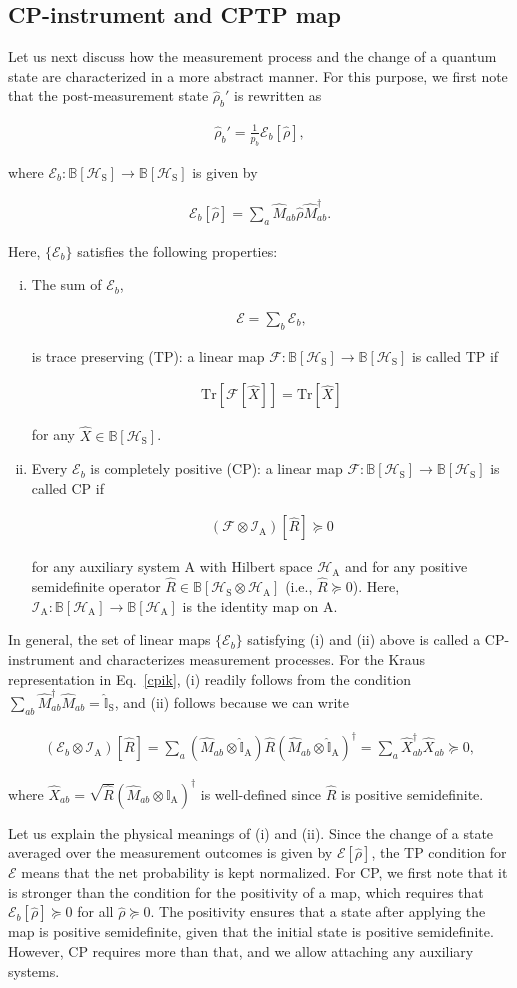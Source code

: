 \documentclass[preprint,pteplogo]{ptephy_v2}%
\numberwithin{equation}{section}
\theoremstyle{definition}
\newcommand{\mc}[1]{\mathcal{#1}}
\newcommand{\ml}[1]{\mathcal{#1}}
\newcommand{\mr}[1]{\mathrm{#1}}
\newcommand{\mbb}[1]{\mathbb{#1}}
\newcommand{\aln}[1]{
\begin{align}
#1
\end{align}
}
\newcommand{\ra}{\rightarrow}
\newcommand{\Tr}{\mr{Tr}}
\begin{document}
\subsection{CP-instrument and CPTP map}
Let us next discuss how the measurement process and the change of a quantum state are characterized in a more abstract manner.
For this purpose, we first note that the post-measurement state $\hat{\rho}_b'$ is rewritten as
\aln{\label{change}
\hat{\rho}_b'=\frac{1}{p_b}\ml{E}_b[\hat{\rho}],
}
where $\ml{E}_b:\mbb{B}[\ml{H}_\mr{S}]\ra\mbb{B}[\ml{H}_\mr{S}]$ is given by
\aln{\label{cpik}
\ml{E}_b[\hat{\rho}]=\sum_a\hat{M}_{ab}\hat{\rho}\hat{M}_{ab}^\dag.
}
Here, $\{\ml{E}_b\}$ satisfies the following properties:
\begin{enumerate}[(i)]
\def\labelenumi{(\theenumi)}
\item 
The sum of $\mc{E}_b$,
\aln{
\ml{E}=\sum_b\ml{E}_b,
}
is trace preserving (TP): a linear map $\mc{F}: \mbb{B}[\mc{H}_\mr{S}] \to \mbb{B}[\mc{H}_\mr{S}]$ is called TP if
\aln{
\Tr[\ml{F}[\hat{X}]]=\Tr[\hat{X}]
}
for any $\hat{X} \in \mbb{B}[\mc{H}_\mr{S}]$.

\item 
Every $\mc{E}_b$ is completely positive (CP): a linear map $\mc{F}: \mbb{B}[\mc{H}_\mr{S}] \to \mbb{B}[\mc{H}_\mr{S}]$ is called CP if
\aln{
\label{eq:DefCP}
(\ml{F}\otimes \ml{I}_\mr{A})[\hat{R}]\succeq 0
}
for any auxiliary system A with Hilbert space $\mc{H}_\mr{A}$ and for any positive semidefinite operator $\hat{R} \in \mbb{B}[\mc{H}_\mr{S} \otimes \mc{H}_\mr{A}]$ (i.e., $\hat{R} \succeq 0$).
Here, $\mc{I}_\mr{A}: \mbb{B}[\mc{H}_\mr{A}] \to \mbb{B}[\mc{H}_\mr{A}]$ is the identity map on A.
\end{enumerate}

In general, the set of linear maps $\{\ml{E}_b\}$ satisfying (i) and (ii) above is called a CP-instrument and characterizes measurement processes.
For the Kraus representation in Eq.~\eqref{cpik}, (i) readily follows from the condition $\sum_{ab}\hat{M}_{ab}^\dag \hat{M}_{ab}=\hat{\mbb{I}}_\mr{S}$, and (ii) follows because we can write
\aln{\label{kracp}
(\ml{E}_b\otimes \ml{I}_\mr{A})[\hat{R}]=\sum_a(\hat{M}_{ab}\otimes\hat{\mbb{I}}_\mr{A})\hat{R}(\hat{M}_{ab}\otimes\hat{\mbb{I}}_\mr{A})^\dag=\sum_a \hat{X}_{ab}^\dag \hat{X}_{ab}\succeq 0,
}
where $\hat{X}_{ab}=\sqrt{\hat{R}}(\hat{M}_{ab}\otimes\mbb{I}_\mr{A})^\dag$ is well-defined since  $\hat{R}$ is positive semidefinite.

Let us explain the physical meanings of (i) and (ii). 
Since the change of a state averaged over the measurement outcomes is given by $\ml{E}[\hat{\rho}]$, the TP condition for $\ml{E}$ means that the net probability is kept normalized.
For CP, we first note that it is stronger than the condition for the positivity of a map, which requires that $\ml{E}_b[\hat{\rho}]\succeq 0$ for all $\hat{\rho}\succeq 0$.
The positivity ensures that a state after applying the map is positive semidefinite, given that the initial state is positive semidefinite.
However, CP requires more than that, and we allow attaching any auxiliary systems.
\end{document}
